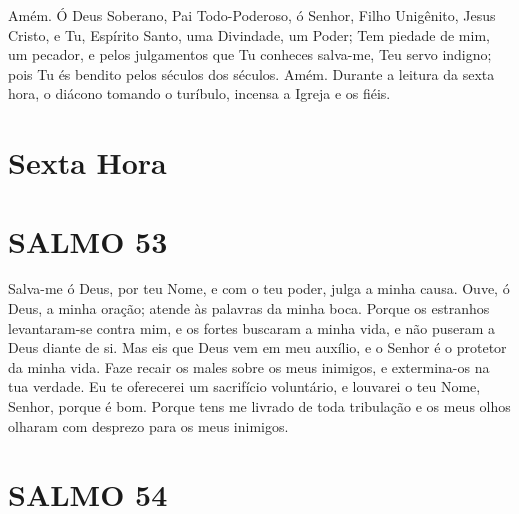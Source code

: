 \documentclass{subfiles}
\begin{document}
\reader{}Amém. Ó Deus Soberano, Pai Todo-Poderoso, ó Senhor, Filho
Unigênito, Jesus Cristo, e Tu, Espírito Santo, uma Divindade, um Poder; Tem
piedade de mim, um pecador, e pelos julgamentos que Tu conheces salva-me,
Teu servo indigno; pois Tu és bendito pelos séculos dos séculos. Amém.
Durante a leitura da sexta hora, o diácono tomando o turíbulo, incensa a Igreja
e os fiéis.

\section*{Sexta Hora}


\section*{SALMO 53}

Salva-me ó Deus, por teu Nome, e com o teu poder, julga a minha
causa. Ouve, ó Deus, a minha oração; atende às palavras da minha boca.
Porque os estranhos levantaram-se contra mim, e os fortes buscaram a minha
vida, e não puseram a Deus diante de si. Mas eis que Deus vem em meu auxílio,
e o Senhor é o protetor da minha vida. Faze recair os males sobre os meus
inimigos, e extermina-os na tua verdade. Eu te oferecerei um sacrifício
voluntário, e louvarei o teu Nome, Senhor, porque é bom. Porque tens me
livrado de toda tribulação e os meus olhos olharam com desprezo para os
meus inimigos.

\section*{SALMO 54}
\end{document}
